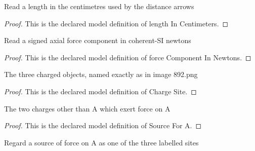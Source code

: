 \begin{definition}
  \label{def:physics:phyx-mini-0892:phyxminiproblems-problemphyxmini0892-lengthincentimeters}
  Read a length in the centimetres used by the distance arrows
\end{definition}
\begin{proof}
  This is the declared model definition of length In Centimeters.
\end{proof}
\begin{definition}
  \label{def:physics:phyx-mini-0892:phyxminiproblems-problemphyxmini0892-forcecomponentinnewtons}
  Read a signed axial force component in coherent-SI newtons
\end{definition}
\begin{proof}
  This is the declared model definition of force Component In Newtons.
\end{proof}
\begin{definition}
  \label{def:physics:phyx-mini-0892:phyxminiproblems-problemphyxmini0892-chargesite}
  The three charged objects, named exactly as in image 892.png
\end{definition}
\begin{proof}
  This is the declared model definition of Charge Site.
\end{proof}
\begin{definition}
  \label{def:physics:phyx-mini-0892:phyxminiproblems-problemphyxmini0892-sourcefora}
  The two charges other than A which exert force on A
\end{definition}
\begin{proof}
  This is the declared model definition of Source For A.
\end{proof}
\begin{definition}
  \label{def:physics:phyx-mini-0892:phyxminiproblems-problemphyxmini0892-sourcefora-tochargesite}
  Regard a source of force on A as one of the three labelled sites
\end{definition}
